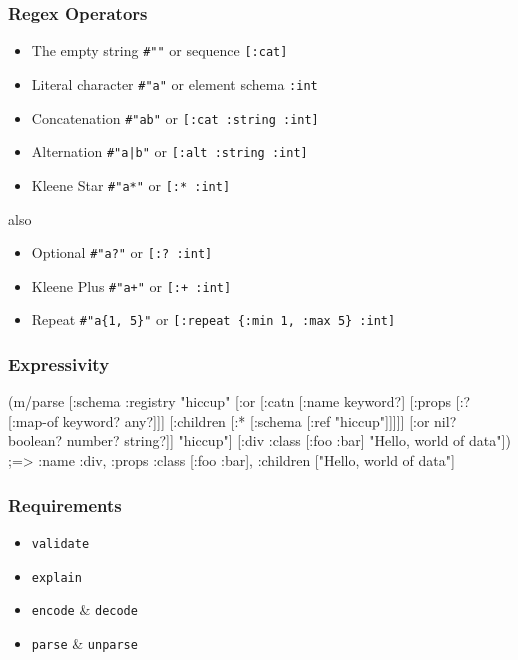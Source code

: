 \documentclass{beamer}
\begin{document}
\begin{frame}
\frametitle{Regex Operators}

\begin{itemize}
\item The empty string \texttt{\#""} or sequence \texttt{[:cat]}
\item Literal character \texttt{\#"a"} or element schema \texttt{:int}
\item Concatenation \texttt{\#"ab"} or \texttt{[:cat :string :int]}
\item Alternation \texttt{\#"a|b"} or \texttt{[:alt :string :int]}
\item Kleene Star \texttt{\#"a*"} or \texttt{[:* :int]}
\end{itemize}

also

\begin{itemize}
\item Optional \texttt{\#"a?"} or \texttt{[:? :int]}
\item Kleene Plus \texttt{\#"a+"} or \texttt{[:+ :int]}
\item Repeat \texttt{\#"a\{1, 5\}"} or \texttt{[:repeat \{:min 1, :max 5\} :int]}
\end{itemize}

\end{frame}


\begin{frame}[fragile]
\frametitle{Expressivity}

{\scriptsize
\begin{semiverbatim}
(m/parse
  [:schema {:registry {"hiccup" [:or
                                 [:catn
                                  [:name keyword?]
                                  [:props [:? [:map-of keyword? any?]]]
                                  [:children [:* [:schema [:ref "hiccup"]]]]]
                                 [:or nil? boolean? number? string?]]}}
   "hiccup"]
  [:div {:class [:foo :bar]}
   "Hello, world of data"])
;=> {:name :div, :props {:class [:foo :bar]}, :children ["Hello, world of data"]}
\end{semiverbatim}
}

\end{frame}


\begin{frame}
\frametitle{Requirements}

\begin{itemize}
\item \texttt{validate}
\item \texttt{explain}
\item \texttt{encode} \& \texttt{decode}
\item \texttt{parse} \& \texttt{unparse}
\end{itemize}
\end{frame}
\end{document}
